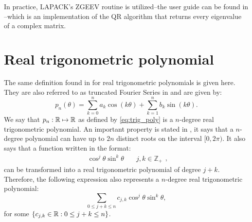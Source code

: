  In practice, LAPACK's ZGEEV routine is utilized--the user guide can be found in --which is an implementation of the QR algorithm that returns every eigenvalue of a complex matrix.
 
\section{Real trigonometric polynomial}

The same definition found in  for real trigonometric polynomials is given here. They are also referred to as truncated Fourier Series in  and are given by:
\begin{equation}\label{eq:trig_poly}
p_n(\theta) = \sum_{k=0}^{n} a_k\cos(k\theta) + \sum_{k=1}^{n} b_k\sin(k\theta).
\end{equation}
We say that $p_n: \mathbb{R} \mapsto \mathbb{R}$ as defined by \autoref{eq:trig_poly} is a $n$-degree real trigonometric polynomial. An important property is stated in , it says that a $n$-degree polynomial can have up to $2n$ distinct roots on the interval $[0, 2\pi)$. It also says that a function written in the format:
$$\begin{array}{cc}\cos^j{\theta}\sin^k{\theta} & \quad j, k \in \mathbb{Z}_+ \end{array},$$
can be transformed into a real trigonometric polynomial of degree $j+k$. Therefore, the following expression also represents a $n$-degree real trigonometric polynomial:
\begin{equation}\label{eq:trig_poly_2}
\sum_{0 \le j+k \le n}c_{j,k}\cos^j{\theta}\sin^k{\theta},
\end{equation}
for some $\{c_{j,k} \in \mathbb{R}: 0 \le j+k \le n\}$.